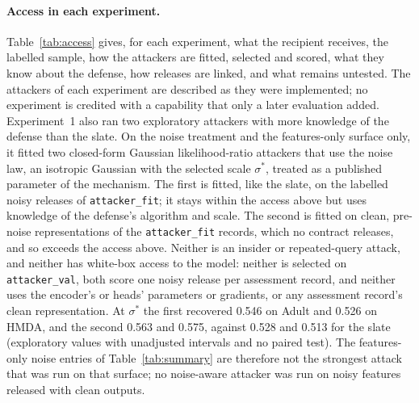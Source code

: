 \documentclass[10pt]{article}
\begin{document}
\paragraph{Access in each experiment.} Table~\ref{tab:access} gives, for each experiment, what the recipient receives,
the labelled sample, how the attackers are fitted, selected and scored, what they know about the defense, how releases
are linked, and what remains untested. The attackers of each experiment are described as they were implemented; no
experiment is credited with a capability that only a later evaluation added. Experiment~1 also ran two exploratory
attackers with more knowledge of the defense than the slate. On the noise treatment and the features-only surface only,
it fitted two closed-form Gaussian likelihood-ratio attackers that use the noise law, an isotropic Gaussian with the
selected scale $\sigma^*$, treated as a published parameter of the mechanism. The first is fitted, like the slate, on the
labelled noisy releases of \texttt{attacker\_fit}; it stays within the access above but uses knowledge of the defense's
algorithm and scale. The second is fitted on clean, pre-noise representations of the \texttt{attacker\_fit} records,
which no contract releases, and so exceeds the access above. Neither is an insider or repeated-query attack, and neither
has white-box access to the model: neither is selected on \texttt{attacker\_val}, both score one noisy release per
assessment record, and neither uses the encoder's or heads' parameters or gradients, or any assessment record's clean
representation. At $\sigma^*$ the first recovered 0.546 on Adult and 0.526 on HMDA, and the second 0.563 and 0.575, against 0.528
and 0.513 for the slate (exploratory values with unadjusted intervals and no paired test). The features-only noise entries
of Table~\ref{tab:summary} are therefore not the strongest attack that was run on that surface; no noise-aware attacker
was run on noisy features released with clean outputs.
\end{document}
